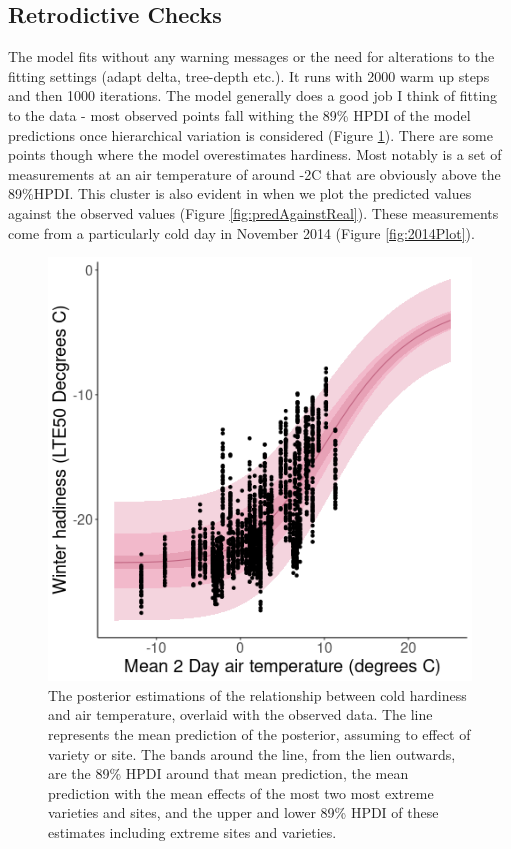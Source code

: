 \documentclass[11pt,letter]{article}
\begin{document}
\subsection{Retrodictive Checks}
The model fits without any warning messages or the need for alterations to the fitting settings (adapt delta, tree-depth etc.). It runs with 2000 warm up steps and then 1000 iterations. The model generally does a good job I think of fitting to the data - most observed points fall withing the 89\% HPDI of the model predictions once hierarchical variation is considered (Figure \ref{fig:predWithReal}). There are some points though where the model overestimates hardiness. Most notably is a set of measurements at an air temperature of around -2\textdegree C that are obviously above the 89\%HPDI.  This cluster is also evident in when we plot the predicted values against the observed values (Figure \ref{fig:predAgainstReal}). These measurements come from a particularly cold day in November 2014 (Figure \ref{fig:2014Plot}).    

\begin{figure}
  \includegraphics[scale = 0.5]{PredWithReal.png}
  \caption{The posterior estimations of the relationship between cold hardiness and air temperature, overlaid with the observed data. The line represents the mean prediction of the posterior, assuming to effect of variety or site. The bands around the line, from the lien outwards, are the 89\% HPDI around that mean prediction, the mean prediction with the mean effects of the most two most extreme varieties and sites, and the upper and lower 89\% HPDI of these estimates including extreme sites and varieties.}
  \label{fig:predWithReal}
\end{figure}
\end{document}
